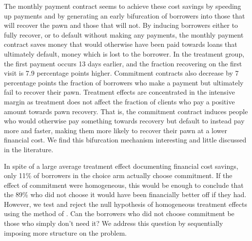 \documentclass[oneside,11pt]{article}
\begin{document}
The monthly payment contract seems to achieve these cost savings by speeding up payments and by generating an early bifurcation of borrowers into those that will recover the pawn and those that will not.  By inducing borrowers either to fully recover, or to default without making any payments, the monthly payment contract saves money that would otherwise have been paid towards loans that ultimately default, money which is lost to the borrower.  In the treatment group, the first payment occurs 13 days earlier, and the fraction recovering on the first visit is 7.9 percentage points higher. Commitment contracts also decrease by 7 percentage points the fraction of borrowers who make a payment but ultimately fail to recover their pawn.  Treatment effects are concentrated in the intensive margin as treatment does not affect the fraction of clients who pay a positive amount towards pawn recovery. That is, the commitment contract induces people who would otherwise pay something towards recovery but default to instead pay more and faster, making them more likely to recover their pawn at a lower financial cost. We find this bifurcation mechanism interesting and little discussed in the literature.

In spite of a large average treatment effect documenting financial cost savings, only 11\% of borrowers in the choice arm actually choose commitment. If the effect of commitment were homogeneous, this would be enough to conclude that the 89\% who did not choose it would have been financially better off if they had. However, we test and reject the null hypothesis of homogeneous treatment effects using the method of \cite{chernozhukov2018generic}. Can the borrowers who did not choose commitment be those who simply don’t need it? We address this question by sequentially imposing more structure on the problem. 
\end{document}
